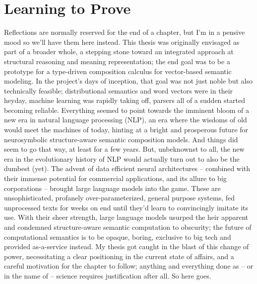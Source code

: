 \chapter{Learning to Prove}
\label{chapter:chapter_4}


\chapabstract{\todo}


Reflections are normally reserved for the end of a chapter, but I'm in a pensive mood so we'll have them here instead.
This thesis was originally envisaged as part of a broader whole, a stepping stone toward an integrated approach at structural reasoning and meaning representation; the end goal was to be a prototype for a type-driven composition calculus for vector-based semantic modeling.
In the project's days of inception, that goal was not just noble but also technically feasible; distributional semantics and word vectors were in their heyday, machine learning was rapidly taking off, parsers all of a sudden started becoming reliable.
Everything seemed to point towards the imminent bloom of a new era in natural language processing (NLP), an era where the wisdoms of old would meet the machines of today, hinting at a bright and prosperous future for neurosymbolic structure-aware semantic composition models.
And things did seem to go that way, at least for a few years.
But, unbeknownst to all, the new era in the evolutionary history of NLP would actually turn out to also be the dumbest (yet).
The advent of data efficient neural architectures -- combined with their immense potential for commercial applications, and its allure to big corporations -- brought large language models into the game.
These are unsophisticated, profanely over-parameterized, general purpose systems, fed unprocessed texts for weeks on end until they'd learn to convincingly imitate its use.
With their sheer strength, large language models usurped the heir apparent and condemned structure-aware semantic computation to obscurity; the future of computational semantics is to be opaque, boring, exclusive to big tech and provided as-a-service instead.
My thesis got caught in the blast of this change of power, necessitating a clear positioning in the current state of affairs, and a careful motivation for the chapter to follow; anything and everything done as -- or in the name of -- science requires justification after all.
So here goes.

